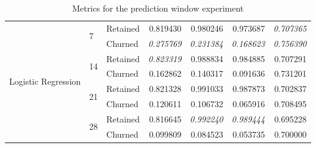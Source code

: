 \documentclass{kththesis}
\begin{document}
\begin{table}[h]
\begin{tabular}{lllrrrr}
\multirow{8}{*}{Logistic Regression} & \multirow{2}{*}{7} & Retained &  0.819430 &  0.980246 &   0.973687 &  \textit{0.707365} \\
     &   & Churned &  \textit{0.275769} &  \textit{0.231384} &   \textit{0.168623} &  \textit{0.756390} \\
\cline{2-7}
     & \multirow{2}{*}{14} & Retained &  \textit{0.823319} &  0.988834 &   0.984885 &  0.707291 \\
     &   & Churned &  0.162862 &  0.140317 &   0.091636 &  0.731201 \\
\cline{2-7}
     & \multirow{2}{*}{21} & Retained &  0.821328 &  0.991033 &   0.987873 &  0.702837 \\
     &   & Churned &  0.120611 &  0.106732 &   0.065916 &  0.708495 \\
\cline{2-7}
     & \multirow{2}{*}{28} & Retained &  0.816645 &  \textit{0.992240} &  \textit{0.989444} &  0.695228 \\
     &   & Churned &  0.099809 &  0.084523 &   0.053735 &  0.700000 \\
\bottomrule
\end{tabular}
\caption{Metrics for the prediction window experiment}
\label{tab:pred_window}
\end{table}

\end{document}

